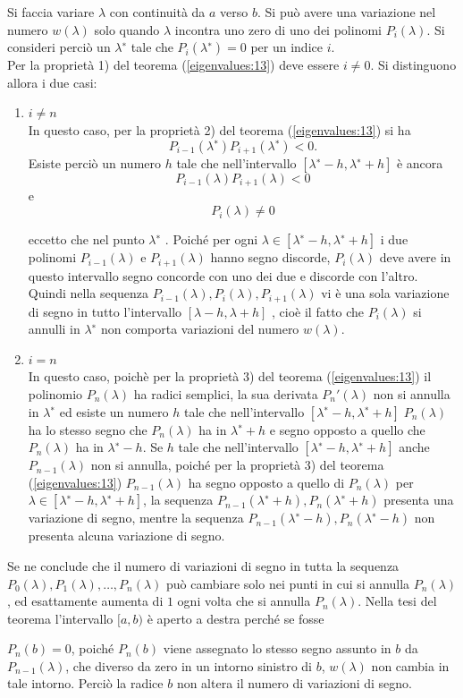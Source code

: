 \begin{thproof}
 Si faccia variare $\lambda$ con continuit\`a da $a$ verso $b$.
Si pu\`o avere una variazione nel numero $w(\lambda)$ solo quando
$\lambda$ incontra uno zero di uno dei
polinomi $P_i (\lambda)$.
Si consideri perci\`o un $\lambda^∗$ tale che $P_i (\lambda^∗ ) = 0$
 per un indice $i$. \\
 Per la propriet\`a 1) del teorema (\ref{eigenvalues:13}) deve essere $i \neq 0$.
Si distinguono allora i due casi:
\begin{enumerate}
\item $i\neq n$ \\
In questo caso, per la propriet\`a 2) del teorema
(\ref{eigenvalues:13})  si ha
$$P_{i−1} (\lambda^∗ )P_{i+1} (\lambda^∗ ) < 0.$$
Esiste perci\`o un numero $h$ tale che nell’intervallo
$[\lambda^∗ − h, \lambda^∗ + h]$
\`e ancora
$$P_{i−1} (\lambda)P_{i+1} (\lambda) < 0$$
e
$$
P_i(\lambda) \neq 0
$$

 eccetto che nel punto $\lambda^∗$ . Poich\'e per ogni
 $\lambda \in [\lambda^∗ − h, \lambda^∗ + h]$ i due
  polinomi $P_{i−1} (\lambda)$ e $P_{i+1} (\lambda)$
  hanno segno discorde, $P_i(\lambda)$ deve avere in
 questo intervallo segno concorde con uno dei due e discorde con
l’altro.
Quindi nella sequenza $P_{i−1} (\lambda), P_i (\lambda), P_{i+1} (\lambda)$
 vi \`e una sola variazione
 di segno in tutto l’intervallo $[\lambda − h, \lambda + h]$
, cio\`e il fatto che $P_i (\lambda)$ si
 annulli in $\lambda^∗$ non comporta variazioni del numero
$w(\lambda)$.

\item $i = n$\\
 In questo caso, poich\`e per la propriet\`a 3) del teorema (\ref{eigenvalues:13}) il
 polinomio $P_n(\lambda)$ ha radici semplici,
la sua derivata $P_n' (\lambda)$ non si annulla
in $\lambda^∗$ ed esiste un numero $h$ tale che nell’intervallo
$[\lambda^∗ -h, \lambda^∗ +h] \; P_n (\lambda)$
 ha lo stesso segno che $P_n (\lambda)$ ha in
$\lambda^∗ + h$ e segno opposto a quello che
 $P_n (\lambda)$ ha in $\lambda^∗ - h$.
Se $h$ tale che nell’intervallo $[\lambda^∗ − h, \lambda^∗ + h]$
 anche
 $P_{n−1} (\lambda)$ non si annulla, poich\'e per la propriet\`a 3)
 del teorema (\ref{eigenvalues:13})
 $P_{n−1} (\lambda)$ ha segno opposto a quello di
$P_n (\lambda)$ per $\lambda \in [\lambda^∗ − h, \lambda^∗ + h]$,
 la  sequenza $P_{n−1} (\lambda^∗ + h), P_n (\lambda^∗ + h)$
 presenta una variazione di segno,
 mentre la sequenza $P_{n−1} (\lambda^∗ - h), P_n (\lambda^∗ - h)$
 non presenta alcuna variazione di segno.
\end{enumerate}
Se ne conclude che il numero di variazioni di segno in tutta la
sequenza $P_0 (\lambda), P_1 (\lambda), \ldots , P_n (\lambda)$ pu\`o
cambiare solo nei punti in cui si annulla $P_n (\lambda)$, ed
esattamente aumenta di $1$ ogni volta che si annulla $P_n (\lambda)$.
Nella tesi del teorema l’intervallo $[a, b)$ \`e aperto a destra
perch\'e se fosse

$P_n (b) = 0$, poich\'e $P_n(b)$ viene assegnato lo stesso segno
assunto in $b$ da $P_{n−1} (\lambda)$, che diverso da zero in un
intorno sinistro di $b$, $w(\lambda)$ non cambia in tale
intorno. Perci\`o la radice $b$ non altera il numero di variazioni di
segno.
\end{thproof}
